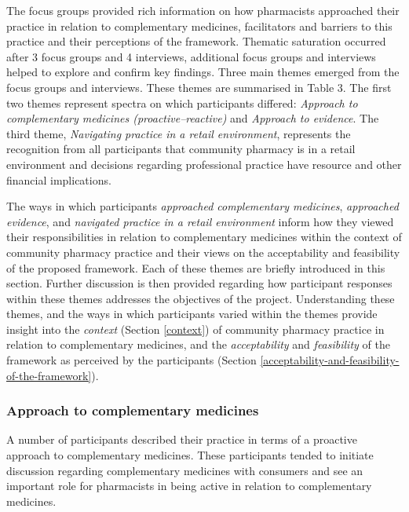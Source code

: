 \documentclass[11pt,a4paper]{article}
\begin{document}
The focus groups provided rich information on how pharmacists approached
their practice in relation to complementary medicines, facilitators and
barriers to this practice and their perceptions of the framework.
Thematic saturation occurred after 3 focus groups and 4 interviews,
additional focus groups and interviews helped to explore and confirm key
findings. Three main themes emerged from the focus groups and
interviews. These themes are summarised in Table 3. The first two themes
represent spectra on which participants differed: \emph{Approach to
complementary medicines (proactive--reactive)} and \emph{Approach to
evidence}. The third theme, \emph{Navigating practice in a retail
environment}, represents the recognition from all participants that
community pharmacy is in a retail environment and decisions regarding
professional practice have resource and other financial implications.



The ways in which participants \emph{approached complementary
medicines}, \emph{approached evidence}, and \emph{navigated practice in
a retail environment} inform how they viewed their responsibilities in
relation to complementary medicines within the context of community
pharmacy practice and their views on the acceptability and feasibility
of the proposed framework. Each of these themes are briefly introduced
in this section. Further discussion is then provided regarding how
participant responses within these themes addresses the objectives of
the project. Understanding these themes, and the ways in which
participants varied within the themes provide insight into the
\emph{context} (Section \ref{context}) of community pharmacy practice in
relation to complementary medicines, and the \emph{acceptability} and
\emph{feasibility} of the framework as perceived by the participants
(Section \ref{acceptability-and-feasibility-of-the-framework}).

\subsubsection{Approach to complementary
medicines}\label{approach-to-complementary-medicines}

A number of participants described their practice in terms of a
proactive approach to complementary medicines. These participants tended
to initiate discussion regarding complementary medicines with consumers
and see an important role for pharmacists in being active in relation to
complementary medicines.
\end{document}
